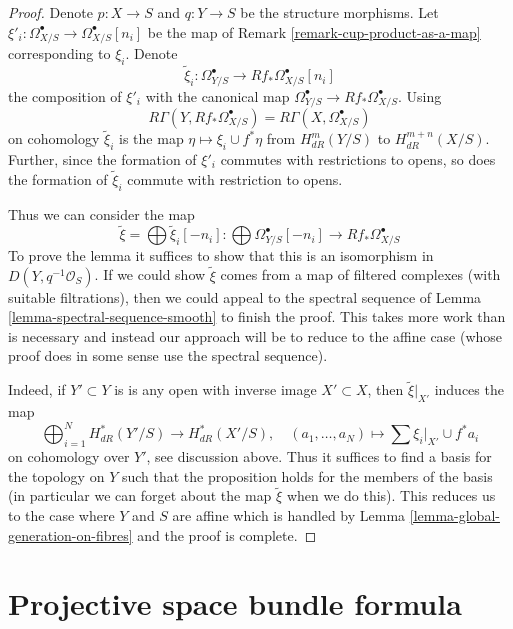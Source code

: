 \begin{proof}
Denote $p : X \to S$ and $q : Y \to S$ be the structure morphisms.
Let $\xi'_i : \Omega^\bullet_{X/S} \to \Omega^\bullet_{X/S}[n_i]$
be the map of Remark \ref{remark-cup-product-as-a-map} corresponding
to $\xi_i$. Denote
$$
\tilde \xi_i :
\Omega^\bullet_{Y/S} \to Rf_*\Omega^\bullet_{X/S}[n_i]
$$
the composition of $\xi'_i$ with the canonical map
$\Omega^\bullet_{Y/S} \to Rf_*\Omega^\bullet_{X/S}$.
Using
$$
R\Gamma(Y, Rf_*\Omega^\bullet_{X/S}) = R\Gamma(X, \Omega^\bullet_{X/S})
$$
on cohomology $\tilde \xi_i$ is the map $\eta \mapsto \xi_i \cup f^*\eta$
from $H^m_{dR}(Y/S)$ to $H^{m + n}_{dR}(X/S)$.
Further, since the formation of $\xi'_i$ commutes with
restrictions to opens, so does the formation of $\tilde \xi_i$
commute with restriction to opens.

\medskip\noindent
Thus we can consider the map
$$
\tilde \xi = \bigoplus \tilde \xi_i[-n_i] :
\bigoplus \Omega^\bullet_{Y/S}[-n_i]
\longrightarrow
Rf_*\Omega^\bullet_{X/S}
$$
To prove the lemma it suffices to show that this is an isomorphism in
$D(Y, q^{-1}\mathcal{O}_S)$. If we could show $\tilde \xi$
comes from a map of filtered complexes (with suitable filtrations),
then we could appeal to the spectral sequence of
Lemma \ref{lemma-spectral-sequence-smooth} to finish the proof.
This takes more work than is necessary and instead our approach
will be to reduce to the affine case (whose proof does in some sense
use the spectral sequence).

\medskip\noindent
Indeed, if $Y' \subset Y$ is is any open with inverse image
$X' \subset X$, then $\tilde \xi|_{X'}$ induces the map
$$
\bigoplus\nolimits_{i = 1}^N H^*_{dR}(Y'/S) \longrightarrow
H^*_{dR}(X'/S), \quad
(a_1, \ldots, a_N) \longmapsto  \sum \xi_i|_{X'} \cup f^*a_i
$$
on cohomology over $Y'$, see discussion above.
Thus it suffices to find a basis for the topology
on $Y$ such that the proposition holds for the members of the basis
(in particular we can forget about the map $\tilde \xi$ when
we do this). This reduces us to the case where $Y$ and $S$
are affine which is handled by Lemma \ref{lemma-global-generation-on-fibres}
and the proof is complete.
\end{proof}





\section{Projective space bundle formula}
\label{section-projective-space-bundle-formula}

